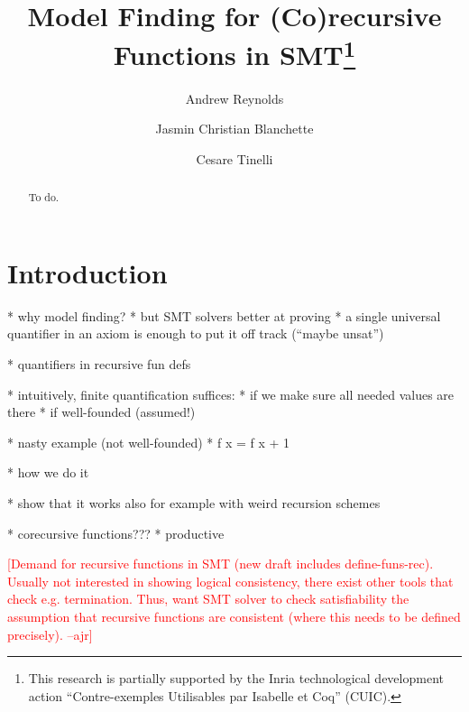 \documentclass[runningheads,a4paper]{llncs}
\newcommand{\rem}[1]{\textcolor{red}{[#1]}}
\newcommand{\ajr}[1]{\rem{#1 --ajr}}
\begin{document}
\title{Model Finding for (Co)recursive Functions in SMT\thanks{%
This research is partially supported by the Inria technological development
action ``Contre-exemples Utilisables par Isabelle et Coq'' (CUIC).
}
}

\author {Andrew Reynolds \and Jasmin Christian Blanchette \and Cesare Tinelli }

\maketitle

\begin{abstract}
To do.
\end{abstract}

\section{Introduction}
\label{sec:introduction}

  * why model finding?
  * but SMT solvers better at proving
    * a single universal quantifier in an axiom is enough to put it off track
      (``maybe unsat'')

  * quantifiers in recursive fun defs

  * intuitively, finite quantification suffices:
    * if we make sure all needed values are there
    * if well-founded (assumed!)

  * nasty example (not well-founded)
    * f x = f x + 1

  * how we do it

  * show that it works also for example with weird recursion schemes

  * corecursive functions???
    * productive


\ajr{Demand for recursive functions in SMT (new draft includes define-funs-rec).  Usually not interested in showing logical consistency, there exist other tools that check e.g. termination. 
Thus, want SMT solver to check satisfiability the assumption that recursive functions are consistent (where this needs to be defined precisely).
}
\end{document}

